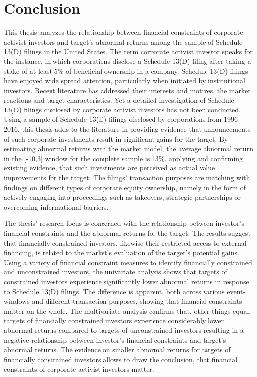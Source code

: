 \documentclass[12pt]{article}
\begin{document}
\section{Conclusion}
\noindent This thesis analyzes the relationship between financial constraints of corporate activist investors and target's abnormal returns among the sample of Schedule 13(D) filings in the United States. The term corporate activist investor speaks for the instance, in which corporations disclose a Schedule 13(D) filing after taking a stake of at least 5\% of beneficial ownership in a company. Schedule 13(D) filings have enjoyed wide spread attention, particularly when initiated by institutional investors. Recent literature has addressed their interests and motives, the market reactions and target characteristics. Yet a detailed investigation of Schedule 13(D) filings disclosed by corporate activist investors has not been conducted. Using a sample of Schedule 13(D) filings disclosed by corporations from 1996-2016, this thesis adds to the literature in providing evidence that announcements of such corporate investments result in significant gains for the target. By estimating abnormal returns with the market model, the average abnormal return in the [-10,3] window for the complete sample is 13\%, applying and confirming existing evidence, that such investments are perceived as actual value improvements for the target. The filings' transaction purposes are matching with findings on different types of corporate equity ownership, namely in the form of actively engaging into proceedings such as takeovers, strategic partnerships or overcoming informational barriers.\par 
The thesis' research focus is concerned with the relationship between investor's financial constraints and the abnormal returns for the target. The results suggest that financially constrained investors, likewise their restricted access to external financing, is related to the market's evaluation of the target's potential gains. Using a variety of financial constraint measures to identify financially constrained and unconstrained investors, the univariate analysis shows that targets of constrained investors experience significantly lower abnormal returns in response to Schedule 13(D) filings. The difference is apparent, both across various event-windows and different transaction purposes, showing that financial constraints matter on the whole. The multivariate analysis confirms that, other things equal, targets of financially constrained investors experience considerably lower abnormal returns compared to targets of unconstrained investors resulting in a negative relationship between investor's financial constraints and target's abnormal returns. The evidence on smaller abnormal returns for targets of financially constrained investors allows to draw the conclusion, that financial constraints of corporate activist investors matter.\par 
\end{document}
